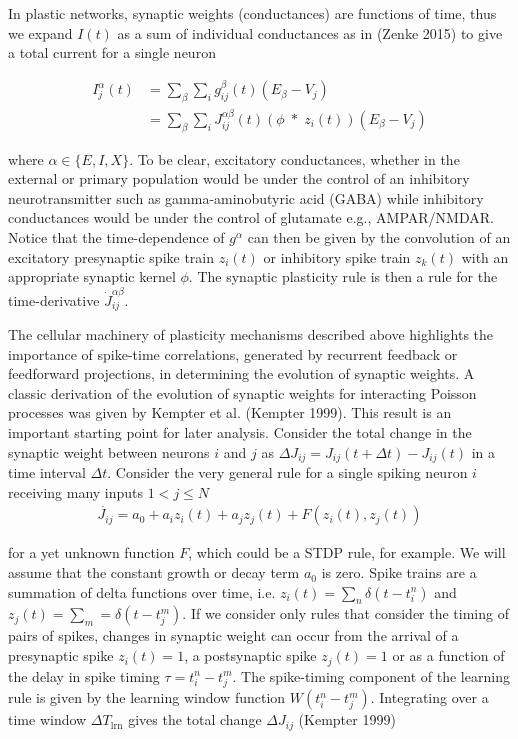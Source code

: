 \documentclass{ucetd}
\begin{document}
In plastic networks, synaptic weights (conductances) are functions of time, thus we expand $I(t)$ as a sum of individual conductances as in (Zenke 2015) to give a total current for a single neuron

\begin{align*}
I_{j}^{\alpha}(t) &= \sum_{\beta}\sum_{i} g_{ij}^{\beta}(t)(E_{\beta} - V_{j})\\
&= \sum_{\beta}\sum_{i}J_{ij}^{\alpha\beta}(t)\left(\phi\;*\;z_{i}(t)\right)(E_{\beta} - V_{j})
\end{align*}

where $\alpha \in \{E,I,X\}$. To be clear, excitatory conductances, whether in the external or primary population would be under the control of an inhibitory neurotransmitter such as gamma-aminobutyric acid (GABA) while inhibitory conductances would be under the control of glutamate e.g., AMPAR/NMDAR. Notice that the time-dependence of $g^{\alpha}$ can then be given by the convolution of an excitatory presynaptic spike train $z_{i}(t)$ or inhibitory spike train $z_{k}(t)$ with an appropriate synaptic kernel $\phi$. The synaptic plasticity rule is then a rule for the time-derivative $\dot{J}^{\alpha\beta}_{ij}$.


The cellular machinery of plasticity mechanisms described above highlights the importance of spike-time correlations, generated by recurrent feedback or feedforward projections, in determining the evolution of synaptic weights. A classic derivation of the evolution of synaptic weights for interacting Poisson processes was given by Kempter et al. (Kempter 1999). This result is an important starting point for later analysis. Consider the total change in the synaptic weight between neurons $i$ and $j$ as $\Delta J_{ij} = J_{ij}(t+\Delta t) - J_{ij}(t)$ in a time interval $\Delta t$. Consider the very general rule for a single spiking neuron $i$ receiving many inputs $1 < j \leq N$ 
\begin{align*}
\dot{J_{ij}} = a_{0} + a_{i}z_{i}(t) + a_{j}z_{j}(t) + F(z_{i}(t),z_{j}(t))
\end{align*}

for a yet unknown function $F$, which could be a STDP rule, for example. We will assume that the constant growth or decay term $a_{0}$ is zero. Spike trains are a summation of delta functions over time, i.e. $z_{i}(t) = \sum_{n} \delta(t-t_{i}^{n})$ and $z_{j}(t) = \sum_{m} = \delta(t-t_{j}^{m})$. If we consider only rules that consider the timing of pairs of spikes, changes in synaptic weight can occur from the arrival of a presynaptic spike $z_{i}(t) = 1$, a postsynaptic spike $z_{j}(t) = 1$ or as a function of the delay in spike timing  $\tau = t_{i}^{n} - t_{j}^{m}$. The spike-timing component of the learning rule is given by the learning window function $W(t_{i}^{n} - t_{j}^{m})$. Integrating over a time window $\Delta T_{\mathrm{lrn}}$ gives the total change $\Delta J_{ij}$ (Kempter 1999)
\end{document}
